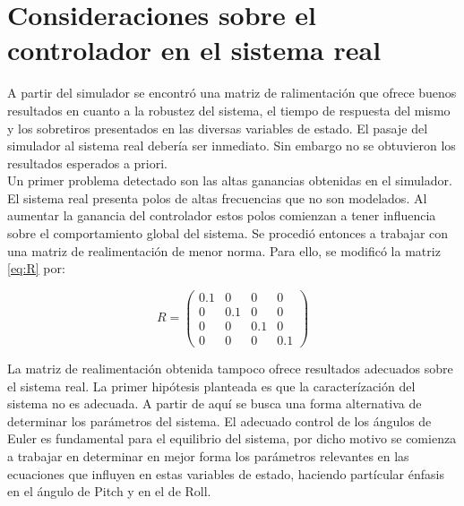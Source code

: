\documentclass[main]{subfiles}
\begin{document}
\chapter{Consideraciones sobre el controlador en el sistema real}
\label{chap:verificaciones_modelado}

A partir del simulador se encontr\'o una matriz de ralimentaci\'on que ofrece buenos resultados en cuanto a la robustez del sistema, el tiempo de respuesta del mismo y los sobretiros presentados en las diversas variables de estado. El pasaje del simulador al sistema real deber\'ia ser inmediato. Sin embargo no se obtuvieron los resultados esperados a priori.\\

Un primer problema detectado son las altas ganancias obtenidas en el simulador. El sistema real presenta polos de altas frecuencias que no son modelados. Al aumentar la ganancia del controlador estos polos comienzan a tener influencia sobre el comportamiento global del sistema. Se procedi\'o entonces a trabajar con una matriz de realimentaci\'on de menor norma. Para ello, se modific\'o la matriz \ref{eq:R} por:

\begin{equation}
R = \left(\begin{array}{cccc}
0.1 &0 &0 &0\\
0 &0.1 &0 &0\\
0 &0 &0.1 &0\\
0 &0 &0 &0.1
\end{array}\right)
\end{equation}

La matriz de realimentaci\'on obtenida tampoco ofrece resultados adecuados sobre el sistema real. La primer hip\'otesis planteada es que la caracter\'izaci\'on del sistema no es adecuada. A partir de aqu\'i se busca una forma alternativa de determinar los par\'ametros del sistema. El adecuado control de los \'angulos de Euler es fundamental para el equilibrio del sistema, por dicho motivo se comienza a trabajar en determinar en mejor forma los par\'ametros relevantes en las ecuaciones que influyen en estas variables de estado, haciendo part\'icular \'enfasis en el \'angulo de Pitch y en el de Roll.\\
\end{document}
